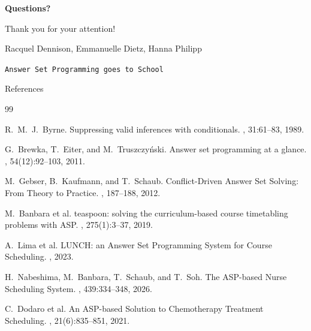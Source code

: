 \documentclass[aspectratio=169]{beamer}
\begin{document}
\begin{frame}[plain]
    \centering
    \vspace{2cm}

    \Huge \textbf{Questions?}

    \vspace{1.5cm}

    \Large Thank you for your attention!

    \vspace{1cm}

    \normalsize
    Racquel Dennison, Emmanuelle Dietz, Hanna Philipp

    \vspace{0.5cm}

    \small
    \texttt{Answer Set Programming goes to School}
\end{frame}

\begin{frame}[allowframebreaks]{References}
    \footnotesize
    \begin{thebibliography}{99}

    R.~M.~J.~Byrne.
    \newblock Suppressing valid inferences with conditionals.
    , 31:61--83, 1989.

    G.~Brewka, T.~Eiter, and M.~Truszczyński.
    \newblock Answer set programming at a glance.
    , 54(12):92--103, 2011.

    M.~Gebser, B.~Kaufmann, and T.~Schaub.
    \newblock Conflict-Driven Answer Set Solving: From Theory to Practice.
    , 187--188, 2012.

    M.~Banbara et al.
    \newblock teaspoon: solving the curriculum-based course timetabling problems with ASP.
    , 275(1):3--37, 2019.

    A.~Lima et al.
    \newblock LUNCH: an Answer Set Programming System for Course Scheduling.
    , 2023.

    H.~Nabeshima, M.~Banbara, T.~Schaub, and T.~Soh.
    \newblock The ASP-based Nurse Scheduling System.
    , 439:334--348, 2026.

    C.~Dodaro et al.
    \newblock An ASP-based Solution to Chemotherapy Treatment Scheduling.
    , 21(6):835--851, 2021.

    \end{thebibliography}
\end{frame}
\end{document}
